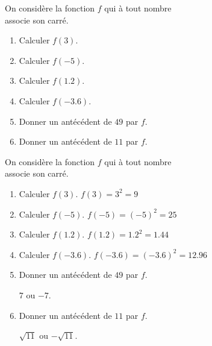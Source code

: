 \begin{exercice}
    On considère la fonction $f$ qui à tout nombre \\associe son carré.
    \begin{enumerate}
        \item Calculer $f(3)$.
        \item Calculer $f(-5)$.
        \item Calculer $f(\num{1.2})$.
        \item Calculer $f(\num{-3.6})$.
        \item Donner un antécédent de $49$ par $f$.
        \item Donner un antécédent de $11$ par $f$.
    \end{enumerate}
\end{exercice}
\begin{corrige}
    On considère la fonction $f$ qui à tout nombre \\associe son carré.
    
    \begin{enumerate}
        \item Calculer $f(3)$. {\red  $f(3)=3^2=9$}
        \item Calculer $f(-5)$. {\red  $f(-5)=(-5)^2=25$}
        \item Calculer $f(\num{1.2})$. {\red  $f(\num{1.2})=\num{1.2}^2=\num{1.44}$}
        \item Calculer $f(\num{-3.6})$. {\red $f(\num{-3.6})=(\num{-3.6})^2=\num{12.96}$ }
        \item Donner un antécédent de $49$ par $f$.
        
        {\red $7$ ou $-7$.}
        \item Donner un antécédent de $11$ par $f$.
        
        {\red $\sqrt{11}$ ou $-\sqrt{11}$.}
    \end{enumerate}
\end{corrige}
